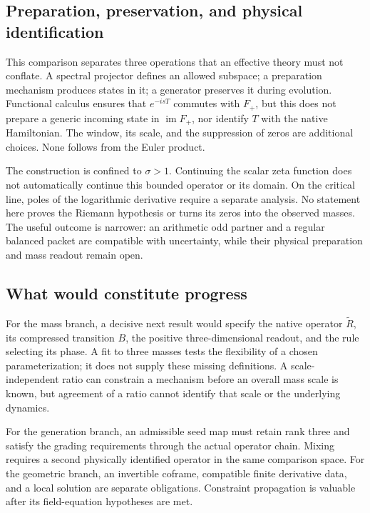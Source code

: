 \documentclass[11pt,a4paper]{article}
\begin{document}
\subsection{Preparation, preservation, and physical identification}

This comparison separates three operations that an effective theory
must not conflate. A spectral projector defines an allowed subspace;
a preparation mechanism produces states in it; a generator preserves
it during evolution. Functional calculus ensures that $e^{-isT}$
commutes with $F_+$, but this does not prepare a generic incoming
state in $\operatorname{im}F_+$, nor identify $T$ with the native
Hamiltonian. The window, its scale, and the suppression of zeros
are additional choices. None follows from the Euler product.

The construction is confined to $\sigma>1$. Continuing the scalar
zeta function does not automatically continue this bounded operator
or its domain. On the critical line, poles of the logarithmic
derivative require a separate analysis. No statement here proves
the Riemann hypothesis or turns its zeros into the observed masses.
The useful outcome is narrower: an arithmetic odd partner and a
regular balanced packet are compatible with uncertainty, while
their physical preparation and mass readout remain open.

\subsection{What would constitute progress}

For the mass branch, a decisive next result would specify the native
operator $\widetilde R$, its compressed transition $B$, the positive
three-dimensional readout, and the rule selecting its phase. A fit
to three masses tests the flexibility of a chosen parameterization;
it does not supply these missing definitions. A scale-independent
ratio can constrain a mechanism before an overall mass scale is
known, but agreement of a ratio cannot identify that scale or the
underlying dynamics.

For the generation branch, an admissible seed map must retain rank
three and satisfy the grading requirements through the actual
operator chain. Mixing requires a second physically identified
operator in the same comparison space. For the geometric branch,
an invertible coframe, compatible finite derivative data, and a
local solution are separate obligations. Constraint propagation is
valuable after its field-equation hypotheses are met.
\end{document}
